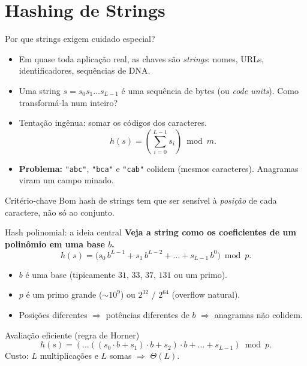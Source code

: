\documentclass[aspectratio=169]{beamer}
\begin{document}
\section{Hashing de Strings}

\begin{frame}[shrink=15]{Por que strings exigem cuidado especial?}
\begin{itemize}
\item Em quase toda aplicação real, as chaves são \emph{strings}: nomes, URLs, identificadores, sequências de DNA.
\item Uma string $s = s_0 s_1 \dots s_{L-1}$ é uma sequência de bytes (ou \emph{code units}). Como transformá-la num inteiro?
\item \alert{Tentação ingênua:} somar os códigos dos caracteres.
$$h(s) = \left(\sum_{i=0}^{L-1} s_i\right) \bmod m.$$
\item \textbf{Problema:} \texttt{"abc"}, \texttt{"bca"} e \texttt{"cab"} colidem (mesmos caracteres). Anagramas viram um campo minado.
\end{itemize}
\begin{alertblock}{Critério-chave}
Bom hash de strings tem que ser sensível à \emph{posição} de cada caractere, não só ao conjunto.
\end{alertblock}
\end{frame}

\begin{frame}[fragile]{Hash polinomial: a ideia central}
\textbf{Veja a string como os coeficientes de um polinômio em uma base $b$.}
$$h(s) = \big(s_0\, b^{L-1} + s_1\, b^{L-2} + \dots + s_{L-1}\, b^0\big) \bmod p.$$
\begin{itemize}
\item $b$ é uma base (tipicamente $31$, $33$, $37$, $131$ ou um primo).
\item $p$ é um primo grande ($\sim 10^9$) ou $2^{32}$ / $2^{64}$ (overflow natural).
\item Posições diferentes $\Rightarrow$ potências diferentes de $b$ $\Rightarrow$ anagramas não colidem.
\end{itemize}
\begin{block}{Avaliação eficiente (regra de Horner)}
$$h(s) = (\dots((s_0 \cdot b + s_1)\cdot b + s_2)\cdot b + \dots + s_{L-1}) \bmod p.$$
Custo: $L$ multiplicações e $L$ somas $\Rightarrow$ $\Theta(L)$.
\end{block}
\end{frame}
\end{document}
